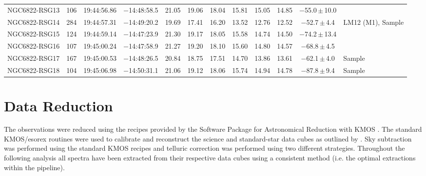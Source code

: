 \begin{table}
\begin{center}
\begin{tabular}{lrcccccccccl}
NGC6822-RSG13 & 106 &   19:44:56.86  &  $-$14:48:58.5  &  21.05  &  19.06  &  18.04  &  15.81  &  15.05  &  14.85  & \a$-$55.0\,$\pm$\,10.0 \\
NGC6822-RSG14 & 284 &   19:44:57.31  &  $-$14:49:20.2  &  19.69  &  17.41  &  16.20  &  13.52  &  12.76  &  12.52  &   $-$52.7\,$\pm$\,4.4  & LM12 (M1), Sample \\
NGC6822-RSG15 & 124 &   19:44:59.14  &  $-$14:47:23.9  &  21.30  &  19.17  &  18.05  &  15.58  &  14.74  &  14.50  & \a$-$74.2\,$\pm$\,13.4  \\
NGC6822-RSG16 & 107 &   19:45:00.24  &  $-$14:47:58.9  &  21.27  &  19.20  &  18.10  &  15.60  &  14.80  &  14.57  &   $-$68.8\,$\pm$\,4.5 \\
NGC6822-RSG17 & 167 &   19:45:00.53  &  $-$14:48:26.5  &  20.84  &  18.75  &  17.51  &  14.70  &  13.86  &  13.61  &   $-$62.1\,$\pm$\,4.0 & Sample\\
NGC6822-RSG18 & 104 &   19:45:06.98  &  $-$14:50:31.1  &  21.06  &  19.12  &  18.06  &  15.74  &  14.94  &  14.78  &   $-$87.8\,$\pm$\,9.4 & Sample\\
\hline
\end{tabular}
\end{center}
\end{table}



\section{Data Reduction} %
\label{sec:data_reduction}

The observations were reduced using the recipes provided by the Software Package for Astronomical Reduction with KMOS
\citep[SPARK;][]{2013A&A...558A..56D}.
The standard KMOS/esorex routines were used to calibrate and reconstruct the science and standard-star data cubes as outlined by
\cite{2013A&A...558A..56D}.
Sky subtraction was performed using the standard KMOS recipes and telluric correction was performed using two different strategies.
Throughout the following analysis all spectra have been extracted from their respective data cubes using a consistent method (i.e. the optimal extractions within the pipeline).

